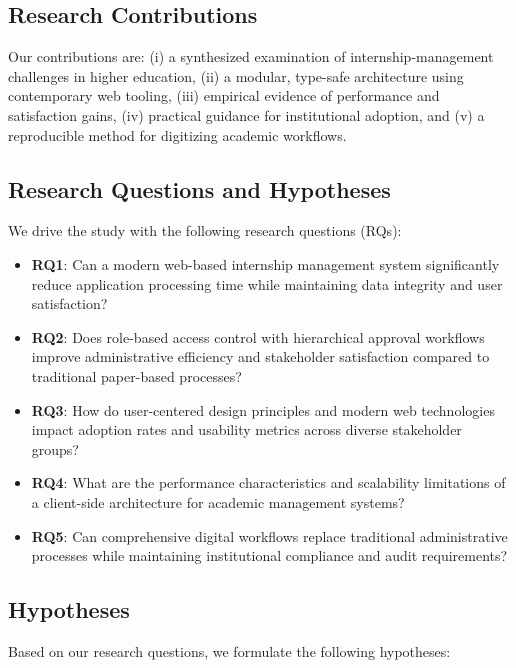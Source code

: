 \documentclass[conference]{IEEEtran}
\begin{document}
\subsection{Research Contributions}
Our contributions are: (i) a synthesized examination of internship-management challenges in higher education, (ii) a modular, type-safe architecture using contemporary web tooling, (iii) empirical evidence of performance and satisfaction gains, (iv) practical guidance for institutional adoption, and (v) a reproducible method for digitizing academic workflows.

\subsection{Research Questions and Hypotheses}
We drive the study with the following research questions (RQs):

\begin{itemize}[leftmargin=*,nosep]
  \item \textbf{RQ1}: Can a modern web-based internship management system significantly reduce application processing time while maintaining data integrity and user satisfaction?
  \item \textbf{RQ2}: Does role-based access control with hierarchical approval workflows improve administrative efficiency and stakeholder satisfaction compared to traditional paper-based processes?
  \item \textbf{RQ3}: How do user-centered design principles and modern web technologies impact adoption rates and usability metrics across diverse stakeholder groups?
  \item \textbf{RQ4}: What are the performance characteristics and scalability limitations of a client-side architecture for academic management systems?
  \item \textbf{RQ5}: Can comprehensive digital workflows replace traditional administrative processes while maintaining institutional compliance and audit requirements?
\end{itemize}

\subsection{Hypotheses}
Based on our research questions, we formulate the following hypotheses:
\end{document}
